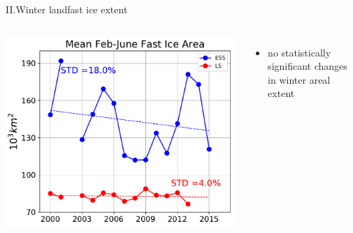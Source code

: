 \documentclass[8pt]{beamer}
\begin{document}
\setwatermark{\fontsize{125pt}{125pt}\selectfont{}}
\begin{frame}[fragile]{II.Winter landfast ice extent}
	\begin{columns}
		\includegraphics[width=1.0\textwidth]{./img/WinterArea_FebMay.pdf}
		\begin{itemize}
			\item no statistically significant changes in winter areal extent
		\end{itemize}
	\end{columns}
\end{frame}
\end{document}
